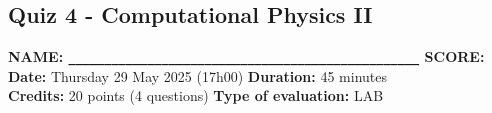 \documentclass[12pt,a4paper]{extarticle}
\date{\today}
\begin{document}
\thispagestyle{empty}

\newpage
\pagestyle{empty}

\begin{center}\section*{Quiz 4 - Computational Physics II}\end{center}
\vspace{0.2cm}
{\bf NAME: \verb|_________________________________________________|  SCORE:} \\
{\bf Date:} Thursday 29 May 2025 (17h00) \hspace{0.25cm} {\bf Duration:} 45 minutes\\
  \hspace{0.25cm} {\bf Credits:} 20 points (4 questions) \hspace{0.25cm}  {\bf Type of evaluation:} LAB\\

\vspace{-0.25cm}

\\
\end{document}
